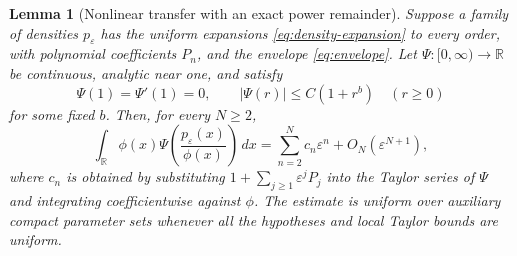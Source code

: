 \documentclass[11pt,a4paper]{article}
\numberwithin{equation}{section}
\newtheorem{lemma}[theorem]{Lemma}
\theoremstyle{definition}
\theoremstyle{remark}
\newcommand{\R}{\mathbb R}
\newcommand{\eps}{\varepsilon}
\newcommand{\dd}{\,dx}
\begin{document}
\begin{lemma}[Nonlinear transfer with an exact power remainder]
\label{lem:transfer}
Suppose a family of densities $p_\eps$ has the uniform expansions
\eqref{eq:density-expansion} to every order, with polynomial coefficients
$P_n$, and the envelope \eqref{eq:envelope}. Let $\Psi:[0,\infty)\to\R$
be continuous, analytic near one, and satisfy
\begin{equation}
 \Psi(1)=\Psi'(1)=0,
 \qquad |\Psi(r)|\le C(1+r^b)
 \quad(r\ge0)
 \label{eq:psi-assumptions}
\end{equation}
for some fixed $b$. Then, for every $N\ge2$,
\begin{equation}
 \int_{\R}\phi(x)\Psi\!\left(\frac{p_\eps(x)}{\phi(x)}\right)\dd
 =\sum_{n=2}^{N}c_n\eps^n+O_N(\eps^{N+1}),
 \label{eq:transfer}
\end{equation}
where $c_n$ is obtained by substituting
$1+\sum_{j\ge1}\eps^jP_j$ into the Taylor series of $\Psi$ and integrating
coefficientwise against $\phi$. The estimate is uniform over auxiliary compact
parameter sets whenever all the hypotheses and local Taylor bounds are uniform.
\end{lemma}
\end{document}
